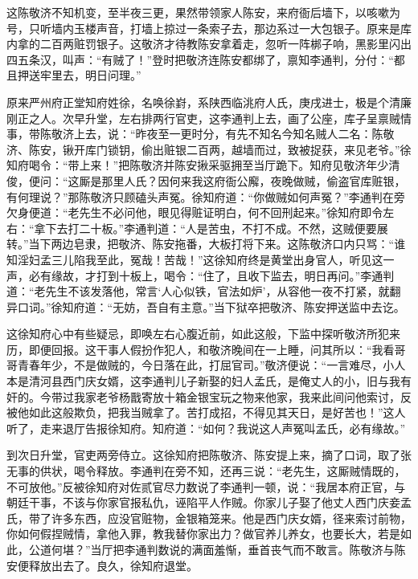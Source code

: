 这陈敬济不知机变，至半夜三更，果然带领家人陈安，来府衙后墙下，以咳嗽为号，只听墙内玉楼声音，打墙上掠过一条索子去，那边系过一大包银子。原来是库内拿的二百两赃罚银子。这敬济才待教陈安拿着走，忽听一阵梆子响，黑影里闪出四五条汉，叫声：“有贼了！”登时把敬济连陈安都绑了，禀知李通判，分付：“都且押送牢里去，明日问理。”

原来严州府正堂知府姓徐，名唤徐崶，系陕西临洮府人氏，庚戌进士，极是个清廉刚正之人。次早升堂，左右排两行官吏，这李通判上去，画了公座，库子呈禀贼情事，带陈敬济上去，说：“昨夜至一更时分，有先不知名今知名贼人二名：陈敬济、陈安，锹开库门锁钥，偷出赃银二百两，越墙而过，致被捉获，来见老爷。”徐知府喝令：“带上来！”把陈敬济并陈安揪采驱拥至当厅跪下。知府见敬济年少清俊，便问：“这厮是那里人氏？因何来我这府衙公廨，夜晚做贼，偷盗官库赃银，有何理说？”那陈敬济只顾磕头声冤。徐知府道：“你做贼如何声冤？”李通判在旁欠身便道：“老先生不必问他，眼见得赃证明白，何不回刑起来。”徐知府即令左右：“拿下去打二十板。”李通判道：“人是苦虫，不打不成。不然，这贼便要展转。”当下两边皂隶，把敬济、陈安拖番，大板打将下来。这陈敬济口内只骂：“谁知淫妇孟三儿陷我至此，冤哉！苦哉！”这徐知府终是黄堂出身官人，听见这一声，必有缘故，才打到十板上，喝令：“住了，且收下监去，明日再问。”李通判道：“老先生不该发落他，常言‘人心似铁，官法如炉’，从容他一夜不打紧，就翻异口词。”徐知府道：“无妨，吾自有主意。”当下狱卒把敬济、陈安押送监中去讫。

这徐知府心中有些疑忌，即唤左右心腹近前，如此这般，下监中探听敬济所犯来历，即便回报。这干事人假扮作犯人，和敬济晚间在一上睡，问其所以：“我看哥哥青春年少，不是做贼的，今日落在此，打屈官司。”敬济便说：“一言难尽，小人本是清河县西门庆女婿，这李通判儿子新娶的妇人孟氏，是俺丈人的小，旧与我有奸的。今带过我家老爷杨戬寄放十箱金银宝玩之物来他家，我来此间问他索讨，反被他如此这般欺负，把我当贼拿了。苦打成招，不得见其天日，是好苦也！”这人听了，走来退厅告报徐知府。知府道：“如何？我说这人声冤叫孟氏，必有缘故。”

到次日升堂，官吏两旁侍立。这徐知府把陈敬济、陈安提上来，摘了口词，取了张无事的供状，喝令释放。李通判在旁不知，还再三说：“老先生，这厮贼情既的，不可放他。”反被徐知府对佐贰官尽力数说了李通判一顿，说：“我居本府正官，与朝廷干事，不该与你家官报私仇，诬陷平人作贼。你家儿子娶了他丈人西门庆妾孟氏，带了许多东西，应没官赃物，金银箱笼来。他是西门庆女婿，径来索讨前物，你如何假捏贼情，拿他入罪，教我替你家出力？做官养儿养女，也要长大，若是如此，公道何堪？”当厅把李通判数说的满面羞惭，垂首丧气而不敢言。陈敬济与陈安便释放出去了。良久，徐知府退堂。

